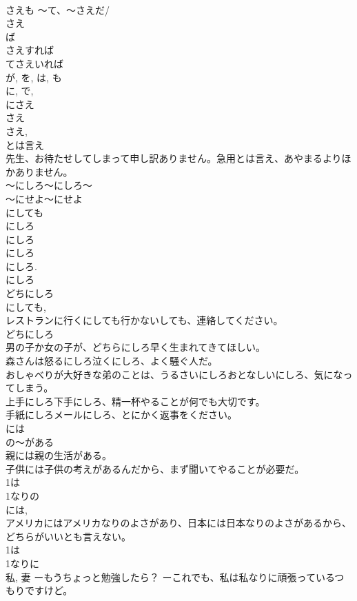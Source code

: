 \documentclass[8pt]{extreport}
\begin{document}
\begin{CJK}{UTF8}{min}
\\	さえも ～て、～さえだ/
\\	さえ
\\	ば 
\\	さえすれば 
\\	てさえいれば 
\\	が, を, は, も 
\\	に, で, 
\\	にさえ 
\\	さえ 
\\	さえ, 
\\	とは言え 
\\	先生、お待たせしてしまって申し訳ありません。急用とは言え、あやまるよりほかありません。　
\\	～にしろ～にしろ～ 
\\	～にせよ～にせよ 
\\	にしても 
\\	にしろ
\\	にしろ 
\\	にしろ
\\	にしろ. 
\\	にしろ 
\\	どちにしろ 
\\	にしても, 
\\	レストランに行くにしても行かないしても、連絡してください。 
\\	どちにしろ 
\\	男の子か女の子が、どちらにしろ早く生まれてきてほしい。 
\\	森さんは怒るにしろ泣くにしろ、よく騒ぐ人だ。 
\\	おしゃべりが大好きな弟のことは、うるさいにしろおとなしいにしろ、気になってしまう。 
\\	上手にしろ下手にしろ、精一杯やることが何でも大切です。 
\\	手紙にしろメールにしろ、とにかく返事をください。 
\\	には
\\	の～がある	
\\	親には親の生活がある。 
\\	子供には子供の考えがあるんだから、まず聞いてやることが必要だ。 
\\	1は
\\	1なりの
\\	には, 
\\	アメリカにはアメリカなりのよさがあり、日本には日本なりのよさがあるから、どちらがいいとも言えない。 
\\	1は
\\	1なりに
\\	私, 妻 ーもうちょっと勉強したら？ ーこれでも、私は私なりに頑張っているつもりですけど。 

\end{CJK}
\end{document}
